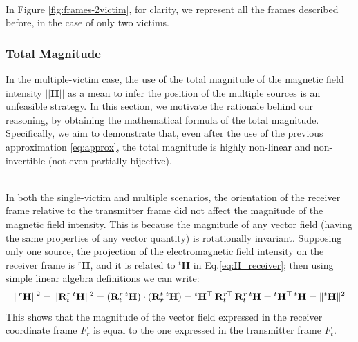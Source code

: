 \documentclass[main]{subfiles}
\begin{document}
\noindent\\
In Figure \ref{fig:frames-2victim}, for clarity, we represent all the frames described before, 
in the case of only two victims.
 

\subsubsection{Total Magnitude}
In the multiple-victim case, the use of the total magnitude of the magnetic
field intensity $|| \mathbf{H} ||$ as a mean to infer the position of
the multiple sources is an unfeasible strategy.
In this section, we motivate the rationale behind our reasoning, by obtaining
the mathematical formula of the total magnitude.
Specifically, we aim to demonstrate that, even after the use of the previous 
approximation \eqref{eq:approx}, the total magnitude is highly non-linear and 
non-invertible (not even partially bijective).

\noindent\\
In both the single-victim and multiple scenarios, the orientation of the receiver frame 
relative to the transmitter frame did not affect the magnitude of the magnetic 
field intensity.
This is because the magnitude of any vector field (having the same 
properties of any vector quantity) is rotationally invariant.
Supposing only one source, the projection of the electromagnetic field intensity on the receiver frame is ${}^r\mathbf{H}$,
and it is related to ${}^t \mathbf{H}$ in Eq.\ref{eq:H_receiver}; then 
using simple linear algebra definitions we can write:
\begin{equation}
\|{}^r\mathbf{H}\|^2 = \|\mathbf{R}^r_t \, {}^t\mathbf{H}\|^2 = 
(\mathbf{R}^r_t \, {}^t\mathbf{H}) \cdot (\mathbf{R}^t_r \, {}^t\mathbf{H}) = 
{}^t\mathbf{H}^\top \, {\mathbf{R}^r_t}\mkern-2mu^\top \, \mathbf{R}^r_t \, {}^t\mathbf{H} = 
{}^t\mathbf{H}^\top \, {}^t\mathbf{H} = \|{}^t\mathbf{H}\|^2
\label{eq:magnitude_invariant}
\end{equation}
This shows that the magnitude of the vector field expressed in the receiver 
coordinate frame $F_r$ is equal to the one expressed in the transmitter frame $F_t$.
\end{document}
